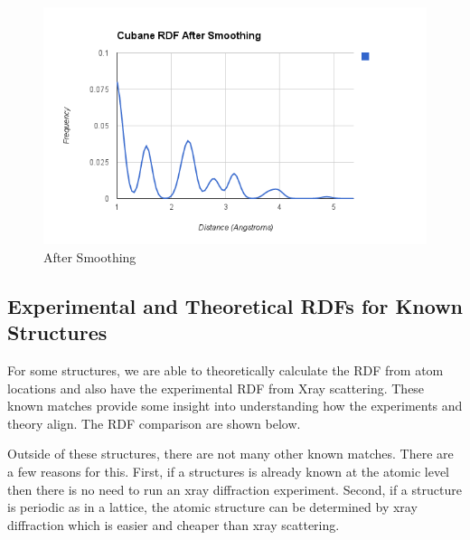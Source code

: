 \documentclass[12pt,letterpaper]{article}
\begin{document}
\begin{figure}[h!]
  \begin{center}
    \includegraphics[scale=0.7]{figs/cubane_rdf_after_smoothing.png}
    \caption{After Smoothing}
  \end{center}
\end{figure}
\clearpage

\subsection{Experimental and Theoretical RDFs for Known Structures}
For some structures, we are able to theoretically calculate the RDF from atom
locations and also have the experimental RDF from Xray scattering. These known
matches provide some insight into understanding how the experiments and theory
align. The RDF comparison are shown below.

Outside of these structures, there are not many other known matches. There are a
few reasons for this. First, if a structures is already known at the atomic
level then there is no need to run an xray diffraction experiment. Second, if a
structure is periodic as in a lattice, the atomic structure can be determined by
xray diffraction which is easier and cheaper than xray scattering.
\end{document}
